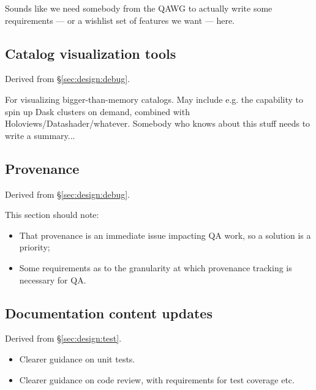 Sounds like we need somebody from the QAWG to actually write some requirements
--- or a wishlist set of features we want --- here.

\subsection{Catalog visualization tools}


Derived from \S\ref{sec:design:debug}.

For visualizing bigger-than-memory catalogs. May include e.g. the capability
to spin up Dask clusters on demand, combined with
Holoviews/Datashader/whatever. Somebody who knows about this stuff needs to
write a summary...

\subsection{Provenance}


Derived from \S\ref{sec:design:debug}.

This section should note:

\begin{itemize}

  \item{That provenance is an immediate issue impacting QA work, so a solution
  is a priority;}

  \item{Some requirements as to the granularity at which provenance tracking
  is necessary for QA.}

\end{itemize}

\subsection{Documentation content updates}
\label{sec:comp:doc}

Derived from \S\ref{sec:design:test}.


\begin{itemize}

  \item{Clearer guidance on unit tests.}
  \item{Clearer guidance on code review, with requirements for test coverage
  etc.}

\end{itemize}

